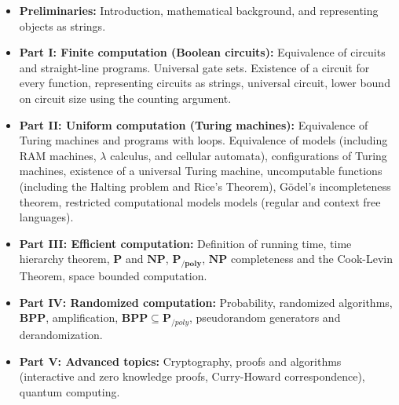 \begin{itemize}
\item
  \textbf{Preliminaries:} Introduction, mathematical background, and
  representing objects as strings.
\item
  \textbf{Part I: Finite computation (Boolean circuits):} Equivalence of
  circuits and straight-line programs. Universal gate sets. Existence of
  a circuit for every function, representing circuits as strings,
  universal circuit, lower bound on circuit size using the counting
  argument.
\item
  \textbf{Part II: Uniform computation (Turing machines):} Equivalence
  of Turing machines and programs with loops. Equivalence of models
  (including RAM machines, \(\lambda\) calculus, and cellular automata),
  configurations of Turing machines, existence of a universal Turing
  machine, uncomputable functions (including the Halting problem and
  Rice's Theorem), Gödel's incompleteness theorem, restricted
  computational models models (regular and context free languages).
\item
  \textbf{Part III: Efficient computation:} Definition of running time,
  time hierarchy theorem, \(\mathbf{P}\) and \(\mathbf{NP}\),
  \(\mathbf{P_{/poly}}\), \(\mathbf{NP}\) completeness and the
  Cook-Levin Theorem, space bounded computation.
\item
  \textbf{Part IV: Randomized computation:} Probability, randomized
  algorithms, \(\mathbf{BPP}\), amplification,
  \(\mathbf{BPP} \subseteq \mathbf{P}_{/poly}\), pseudorandom generators
  and derandomization.
\item
  \textbf{Part V: Advanced topics:} Cryptography, proofs and algorithms
  (interactive and zero knowledge proofs, Curry-Howard correspondence),
  quantum computing.
\end{itemize}


